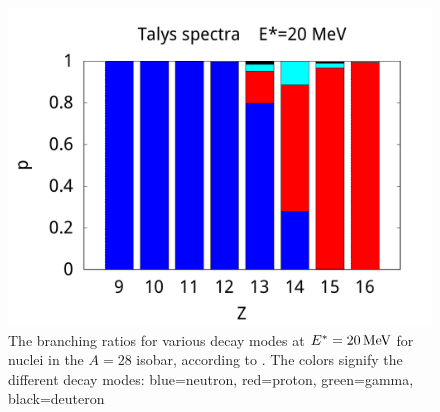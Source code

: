 \begin{figure}
\begin{center}
\includegraphics[width=\bredd\textwidth]{figures/bars/20-t-spectra.pdf}
\caption{\label{fig:barst} The branching ratios for various decay modes at $E^*=\unit[20]{MeV}$ for nuclei in the $A=28$ isobar, according to . The colors signify the different decay modes: blue=neutron, red=proton, green=gamma, black=deuteron}
\end{center}
\end{figure}

